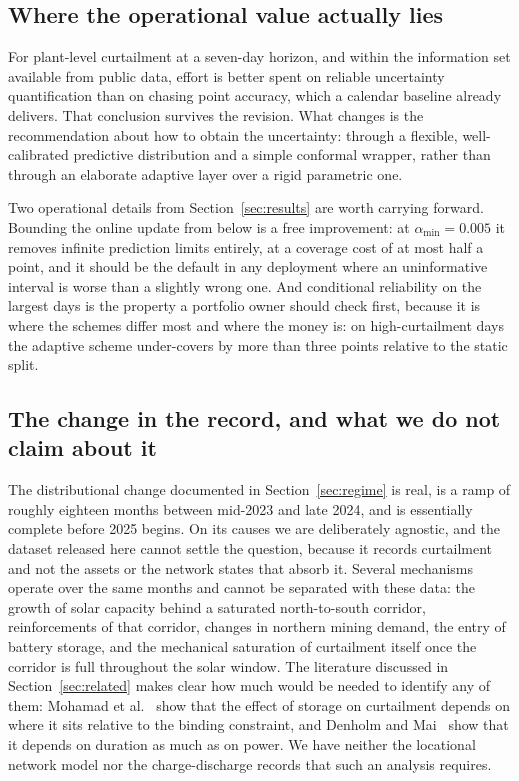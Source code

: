 \documentclass[preprint,3p,times]{elsarticle}
\begin{document}
\subsection{Where the operational value actually lies}

For plant-level curtailment at a seven-day horizon, and within the information set available from public data, effort is better spent on reliable uncertainty quantification than on chasing point accuracy, which a calendar baseline already delivers. That conclusion survives the revision. What changes is the recommendation about how to obtain the uncertainty: through a flexible, well-calibrated predictive distribution and a simple conformal wrapper, rather than through an elaborate adaptive layer over a rigid parametric one.

Two operational details from Section~\ref{sec:results} are worth carrying forward. Bounding the online update from below is a free improvement: at $\alpha_{\min}=0.005$ it removes infinite prediction limits entirely, at a coverage cost of at most half a point, and it should be the default in any deployment where an uninformative interval is worse than a slightly wrong one. And conditional reliability on the largest days is the property a portfolio owner should check first, because it is where the schemes differ most and where the money is: on high-curtailment days the adaptive scheme under-covers by more than three points relative to the static split.

\subsection{The change in the record, and what we do not claim about it}

The distributional change documented in Section~\ref{sec:regime} is real, is a ramp of roughly eighteen months between mid-2023 and late 2024, and is essentially complete before 2025 begins. On its causes we are deliberately agnostic, and the dataset released here cannot settle the question, because it records curtailment and not the assets or the network states that absorb it. Several mechanisms operate over the same months and cannot be separated with these data: the growth of solar capacity behind a saturated north-to-south corridor, reinforcements of that corridor, changes in northern mining demand, the entry of battery storage, and the mechanical saturation of curtailment itself once the corridor is full throughout the solar window. The literature discussed in Section~\ref{sec:related} makes clear how much would be needed to identify any of them: Mohamad et al.~\cite{mohamad2021} show that the effect of storage on curtailment depends on where it sits relative to the binding constraint, and Denholm and Mai~\cite{denholm2019} show that it depends on duration as much as on power. We have neither the locational network model nor the charge-discharge records that such an analysis requires.
\end{document}
